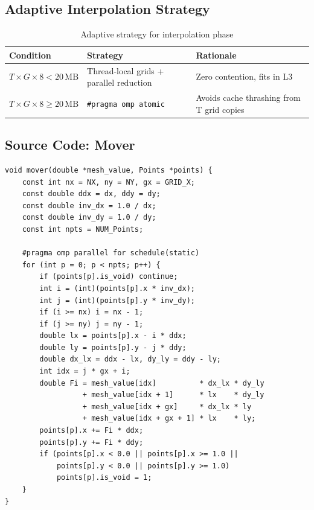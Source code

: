 \documentclass[12pt,a4paper]{article}
\begin{document}
\subsection{Adaptive Interpolation Strategy}

\begin{table}[H]
\centering
\caption{Adaptive strategy for interpolation phase}
\begin{tabular}{lll}
\toprule
\textbf{Condition} & \textbf{Strategy} & \textbf{Rationale} \\
\midrule
$T \times G \times 8 < 20\,\text{MB}$ & Thread-local grids + parallel reduction
    & Zero contention, fits in L3 \\
$T \times G \times 8 \geq 20\,\text{MB}$ & \texttt{\#pragma omp atomic}
    & Avoids cache thrashing from T grid copies \\
\bottomrule
\end{tabular}
\end{table}

\subsection{Source Code: Mover}

\begin{lstlisting}[caption={Parallel mover (gather) kernel (utils.cpp)}, label={lst:mover}]
void mover(double *mesh_value, Points *points) {
    const int nx = NX, ny = NY, gx = GRID_X;
    const double ddx = dx, ddy = dy;
    const double inv_dx = 1.0 / dx;
    const double inv_dy = 1.0 / dy;
    const int npts = NUM_Points;

    #pragma omp parallel for schedule(static)
    for (int p = 0; p < npts; p++) {
        if (points[p].is_void) continue;
        int i = (int)(points[p].x * inv_dx);
        int j = (int)(points[p].y * inv_dy);
        if (i >= nx) i = nx - 1;
        if (j >= ny) j = ny - 1;
        double lx = points[p].x - i * ddx;
        double ly = points[p].y - j * ddy;
        double dx_lx = ddx - lx, dy_ly = ddy - ly;
        int idx = j * gx + i;
        double Fi = mesh_value[idx]          * dx_lx * dy_ly
                  + mesh_value[idx + 1]      * lx    * dy_ly
                  + mesh_value[idx + gx]     * dx_lx * ly
                  + mesh_value[idx + gx + 1] * lx    * ly;
        points[p].x += Fi * ddx;
        points[p].y += Fi * ddy;
        if (points[p].x < 0.0 || points[p].x >= 1.0 ||
            points[p].y < 0.0 || points[p].y >= 1.0)
            points[p].is_void = 1;
    }
}
\end{lstlisting}
\end{document}

